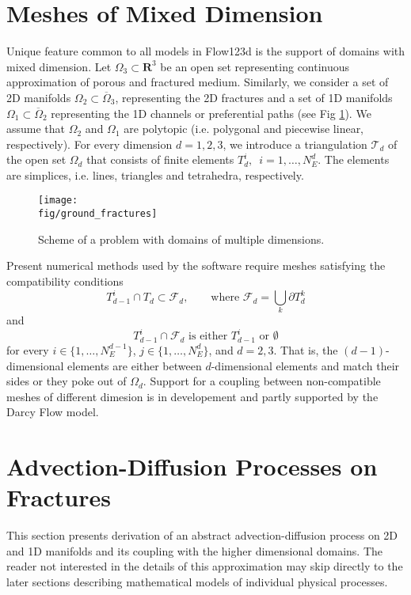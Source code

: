 \documentclass[12pt,a4paper]{report}
\def\Real{{\mathbf R}}
\def\fig{figures}
\begin{document}
\section{Meshes of Mixed Dimension}
Unique feature common to all models in Flow123d is the support of
domains with mixed dimension. 
Let $\Omega_{3} \subset \Real^3$ be an open set representing continuous approximation of porous and fractured medium.
Similarly, we consider a set of 2D manifolds $\Omega_2\subset\overline\Omega_3$, representing the 2D fractures and a set of 1D manifolds $\Omega_1\subset \overline\Omega_2$ 
representing the 1D channels or preferential paths (see Fig \ref{fig:multi-dim}).
We assume that $\Omega_2$ and $\Omega_1$ are polytopic (i.e. polygonal and piecewise linear, respectively).
For every dimension $d=1,2,3$, we introduce a triangulation $\mathcal{T}_{d}$ of the open set $\Omega_d$
that consists of finite elements $T_{d}^{i},$\ $i = 1,\dots,N_{E}^{d}$.
The elements are simplices, i.e. lines, triangles and tetrahedra, respectively.

\begin{figure}[h]
\centering
\texttt{[image: \\fig/ground\_fractures]}
\caption{
    \label{fig:multi-dim}
    Scheme of a problem with domains of multiple dimensions.
}
\end{figure}

Present numerical methods used by the software require meshes satisfying the compatibility conditions
\begin{equation}
        T_{d-1}^i \cap T_d \subset \mathcal{F}_d,   \qquad \text{where } \mathcal{F}_d = \bigcup_{k} \partial T_{d}^{k}
\end{equation}
and
\begin{equation}
        T_{d-1}^i \cap \mathcal{F}_d    \text{ is either $T_{d-1}^i$ or $\emptyset$}    
\end{equation}
for every $i\in\{1,\dots, N_{E}^{d-1}\}$, $j\in\{1,\dots,N_{E}^{d}\}$,  and $d=2,3$. 
That is, the $(d-1)$-dimensional elements are either between $d$-dimensional elements and
match their sides or they poke out of $\Omega_d$. Support for a coupling between non-compatible
meshes of different dimesion is in developement and partly supported by the Darcy Flow model.

\section{Advection-Diffusion Processes on Fractures}
\label{sc:ad_on_fractures}
This section presents derivation of an abstract advection-diffusion process on 2D and 1D manifolds and its coupling with
the higher dimensional domains. The reader not interested in the details of this approximation may skip directly to
the later sections describing mathematical models of individual physical processes.
\end{document}
